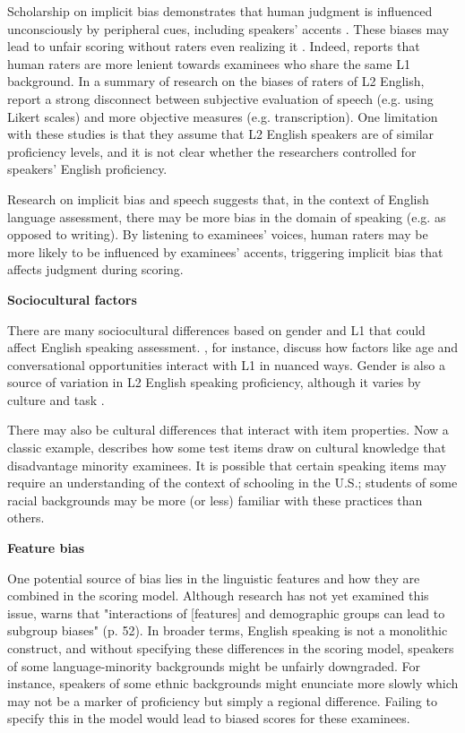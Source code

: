 \documentclass [PhD] {uclathes}
\begin{document}
Scholarship on implicit bias demonstrates that human judgment is influenced unconsciously by peripheral cues, including speakers’ accents \citep{kang2021social}. These biases may lead to unfair scoring without raters even realizing it \citep{greenwald1995}. Indeed, \citet{winke2013} reports that human raters are more lenient towards examinees who share the same L1 background. In a summary of research on the biases of raters of L2 English, \citet{lindemann2013reliably} report a strong disconnect between subjective evaluation of speech (e.g. using Likert scales) and more objective measures (e.g. transcription). One limitation with these studies is that they assume that L2 English speakers are of similar proficiency levels, and it is not clear whether the researchers controlled for speakers’ English proficiency. 

Research on implicit bias and speech suggests that, in the context of English language assessment, there may be more bias in the domain of speaking (e.g. as opposed to writing). By listening to examinees’ voices, human raters may be more likely to be influenced by examinees’ accents, triggering implicit bias that affects judgment during scoring.

\noindent \textbf{Sociocultural factors} \;

There are many sociocultural differences based on gender and L1 that could affect English speaking assessment. \citet{derwing2013development}, for instance, discuss how factors like age and conversational opportunities interact with L1 in nuanced ways. Gender is also a source of variation in L2 English speaking proficiency, although it varies by culture and task \citep{denies2022mapping}. 

There may also be cultural differences that interact with item properties. Now a classic example, \citet{freedle2003correcting} describes how some test items draw on cultural knowledge that disadvantage minority examinees. It is possible that certain speaking items may require an understanding of the context of schooling in the U.S.; students of some racial backgrounds may be more (or less) familiar with these practices than others. 

\noindent \textbf{Feature bias} \;

One potential source of bias lies in the linguistic features and how they are combined in the scoring model. Although research has not yet examined this issue, \citet{zhang2019assessing} warns that "interactions of [features] and demographic groups can lead to subgroup biases" (p. 52). In broader terms, English speaking is not a monolithic construct, and without specifying these differences in the scoring model, speakers of some language-minority backgrounds might be unfairly downgraded. For instance, speakers of some ethnic backgrounds might enunciate more slowly which may not be a marker of proficiency but simply a regional difference. Failing to specify this in the model would lead to biased scores for these examinees.
\end{document}
